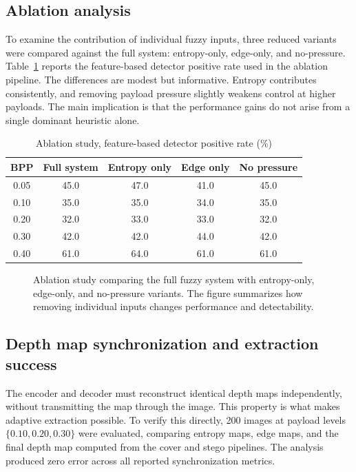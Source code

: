 \subsection{Ablation analysis}
To examine the contribution of individual fuzzy inputs, three reduced variants were compared against the full system: entropy-only, edge-only, and no-pressure. Table~\ref{tab:ablation} reports the feature-based detector positive rate used in the ablation pipeline. The differences are modest but informative. Entropy contributes consistently, and removing payload pressure slightly weakens control at higher payloads. The main implication is that the performance gains do not arise from a single dominant heuristic alone.

\begin{table}[H]
\centering
\caption{Ablation study, feature-based detector positive rate (\%)}
\label{tab:ablation}
\begin{tabular}{ccccc}
\toprule
BPP & Full system & Entropy only & Edge only & No pressure \\
\midrule
0.05 & 45.0 & 47.0 & 41.0 & 45.0 \\
0.10 & 35.0 & 35.0 & 34.0 & 35.0 \\
0.20 & 32.0 & 33.0 & 33.0 & 32.0 \\
0.30 & 42.0 & 42.0 & 44.0 & 42.0 \\
0.40 & 61.0 & 64.0 & 61.0 & 61.0 \\
\bottomrule
\end{tabular}
\end{table}

\begin{figure}[H]
    \centering
    \caption{Ablation study comparing the full fuzzy system with entropy-only, edge-only, and no-pressure variants. The figure summarizes how removing individual inputs changes performance and detectability.}
    \label{fig:ablation_plot}
\end{figure}

\subsection{Depth map synchronization and extraction success}
The encoder and decoder must reconstruct identical depth maps independently, without transmitting the map through the image. This property is what makes adaptive extraction possible. To verify this directly, 200 images at payload levels \(\{0.10, 0.20, 0.30\}\) were evaluated, comparing entropy maps, edge maps, and the final depth map computed from the cover and stego pipelines. The analysis produced zero error across all reported synchronization metrics.

